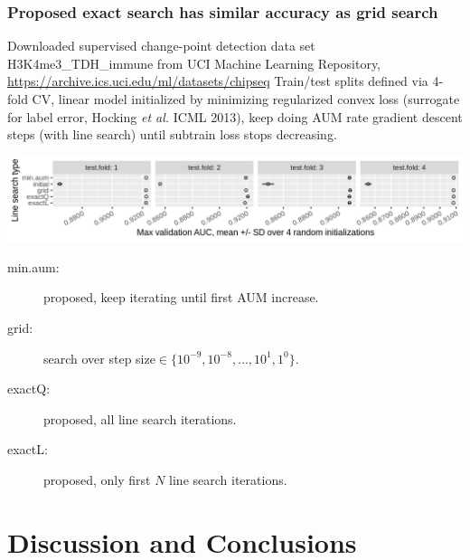 \documentclass[t]{beamer}
\begin{document}
\begin{frame}
  \frametitle{Proposed exact search has similar accuracy as grid search}

  Downloaded supervised change-point detection data set
  H3K4me3\_TDH\_immune from UCI Machine Learning Repository,
  \url{https://archive.ics.uci.edu/ml/datasets/chipseq}
  Train/test splits defined via 4-fold CV, linear model initialized by
  minimizing regularized convex loss (surrogate for label error,
  Hocking \emph{et al.} ICML 2013), keep doing AUM rate gradient
  descent steps (with line search) until subtrain loss stops decreasing.

  \includegraphics[width=\textwidth]{figure-line-search-complexity-compare-H3K4me3_TDH_immune-equal_labels-rate-IntervalRegressionCV-initial}

  \begin{description}
  \item[min.aum:] proposed, keep iterating until first AUM
    increase.
  \item[grid:] search over step
    size$\in\{10^{-9},10^{-8},\dots,10^1,1^0\}$.
  \item[exactQ:] proposed, all line search iterations.
  \item[exactL:] proposed, only first $N$ line search iterations.
  \end{description}
\end{frame}


\section{Discussion and Conclusions}
\end{document}
